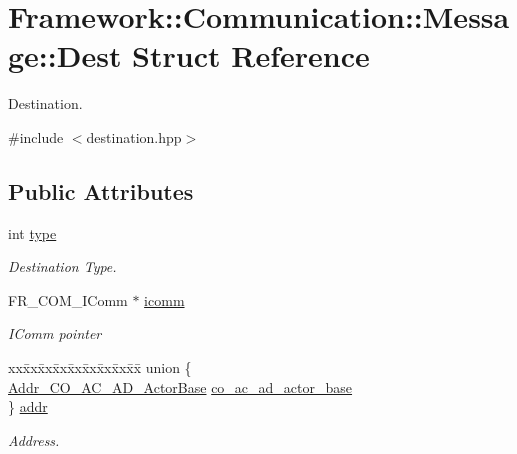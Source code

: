 \hypertarget{structFramework_1_1Communication_1_1Message_1_1Dest}{
\section{Framework::Communication::Message::Dest Struct Reference}
\label{structFramework_1_1Communication_1_1Message_1_1Dest}
}


Destination.  


{\ttfamily \#include $<$destination.hpp$>$}\subsection*{Public Attributes}
\begin{DoxyCompactItemize}
\item 
int \hyperlink{structFramework_1_1Communication_1_1Message_1_1Dest_ac1ec4f8071c73e984673138423c6918f}{type}
\begin{DoxyCompactList}\small\item\em Destination Type. \item\end{DoxyCompactList}\item 
FR\_\-COM\_\-IComm $\ast$ \hyperlink{structFramework_1_1Communication_1_1Message_1_1Dest_aa611b1a91261ddc29153c6ce2382f9f6}{icomm}
\begin{DoxyCompactList}\small\item\em IComm pointer \item\end{DoxyCompactList}\item 
\begin{tabbing}
xx\=xx\=xx\=xx\=xx\=xx\=xx\=xx\=xx\=\kill
union \{\\
\>\hyperlink{structFramework_1_1Communication_1_1Message_1_1Addr__CO__AC__AD__ActorBase}{Addr\_CO\_AC\_AD\_ActorBase} \hyperlink{structFramework_1_1Communication_1_1Message_1_1Dest_af22dbe20ca7387f9450d42bca01b04c7}{co\_ac\_ad\_actor\_base}\\
\} \hyperlink{structFramework_1_1Communication_1_1Message_1_1Dest_ac7f87baccb2cd07e605d3ae1b4a713c1}{addr}\\

\end{tabbing}\begin{DoxyCompactList}\small\item\em Address. \item\end{DoxyCompactList}\end{DoxyCompactItemize}


